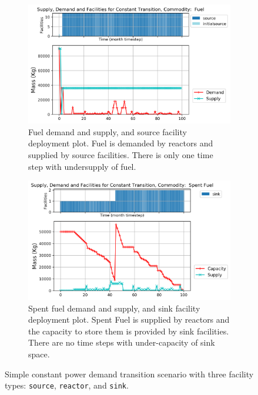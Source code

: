     \begin{figure}[]
        \centering
        \begin{subfigure}[t]{1\textwidth}
            \centering
            \includegraphics[width=0.9\linewidth]{figures/constanttransition-fuel.png} 
            \caption{Fuel demand and supply, and source facility deployment plot.
            Fuel is demanded by reactors and supplied by source facilities.
            There is only one time step with undersupply of fuel.}
            \label{fig:constanttransition-fuel}
        \end{subfigure}
        \begin{subfigure}[t]{1\textwidth}
            \centering
            \includegraphics[width=0.9\linewidth]{figures/constanttransition-spentfuel.png} 
            \caption{Spent fuel demand and supply, and sink facility deployment plot.
                Spent Fuel is supplied by reactors and the capacity to store them 
                is provided by sink facilities.
            There are no time steps with under-capacity of sink space.}
            \label{fig:constanttransition-spentfuel}
        \end{subfigure}
        \caption{Simple constant power demand transition scenario with 
        three facility types: \texttt{source}, \texttt{reactor}, and \texttt{sink}.}
    \end{figure}

